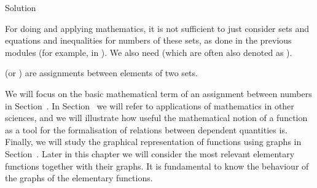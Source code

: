 \begin{MIntro}
\begin{MExercise}
\begin{MHint}{Solution}
\MTikzAuto{%
\begin{tikzpicture}
\draw[->,color=black] (5,0.0) -- (11,0.0);
\foreach \x in {6, 7, 8, 9, 10}
\draw[shift={(\x,0)},color=black] (0pt,2pt) -- (0pt,-2pt) node[below] {\footnotesize $\x$};
\draw (10.7,-0.3) node[] {$\mathbb{R}$};
\draw [line width=2.0pt,color=blue] (8,0.0)-- (8.5,0.0);
\draw [color = blue, fill = white] (8,0) circle (1.5pt);
\draw [fill = blue] (8.5,0) circle (1.5pt);
\end{tikzpicture}
}%

\end{MHint}
\end{MExercise}

For doing and applying mathematics, it is not sufficient to just consider sets and 
equations and inequalities for numbers of these sets, as done in the previous modules (for example, 
in ). We also need  
(which are often also denoted as ).

\begin{MInfo}
 (or ) are assignments between elements of two sets.
\end{MInfo}
\end{MIntro}

We will focus on the basic mathematical term of an assignment between numbers in 
Section~. In Section~ we will refer to  
applications of mathematics in other sciences, and we will illustrate how useful the 
mathematical notion of a function as a tool for the formalisation of relations between 
dependent quantities is. Finally, we will study the graphical representation of functions 
using graphs in Section~. Later in this chapter we will consider 
the most relevant elementary functions together with their graphs. It is fundamental to 
know the behaviour of the graphs of the elementary functions.


